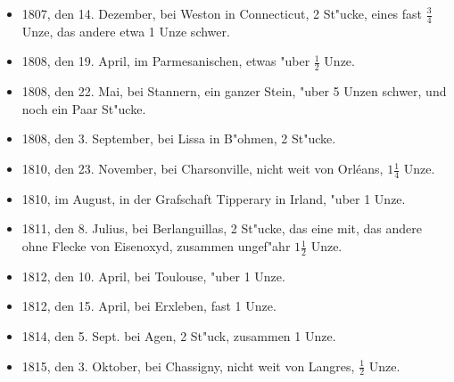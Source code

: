 \documentclass[a4paper, 11pt, oneside, polutonikogreek, german]{article}
\begin{document}
\begin{itemize}
    \item 1807, den 14. Dezember, bei Weston in Connecticut, 2 St"ucke, eines fast $\mathfrak{\frac{3}{4}}$ Unze, das andere etwa 1 Unze schwer.
    \item 1808, den 19. April, im Parmesanischen, etwas "uber $\mathfrak{\frac{1}{2}}$ Unze.
    \item 1808, den 22. Mai, bei Stannern, ein ganzer Stein, "uber 5 Unzen schwer, und noch ein Paar St"ucke.
    \item 1808, den 3. September, bei Lissa in B"ohmen, 2 St"ucke.
    \item 1810, den 23. November, bei Charsonville, nicht weit von Orléans, $\mathfrak{1\frac{1}{4}}$ Unze.
    \item 1810, im August, in der Grafschaft Tipperary in Irland, "uber 1 Unze.
    \item 1811, den 8. Julius, bei Berlanguillas, 2 St"ucke, das eine mit, das andere ohne Flecke von Eisenoxyd, zusammen ungef"ahr $\mathfrak{1\frac{1}{2}}$ Unze.
    \item 1812, den 10. April, bei Toulouse, "uber 1 Unze.
    \item 1812, den 15. April, bei Erxleben, fast 1 Unze.
    \item 1814, den 5. Sept. bei Agen, 2 St"uck, zusammen 1 Unze.
    \item 1815, den 3. Oktober, bei Chassigny, nicht weit von Langres, $\mathfrak{\frac{1}{2}}$ Unze.
\end{itemize}
\end{document}
